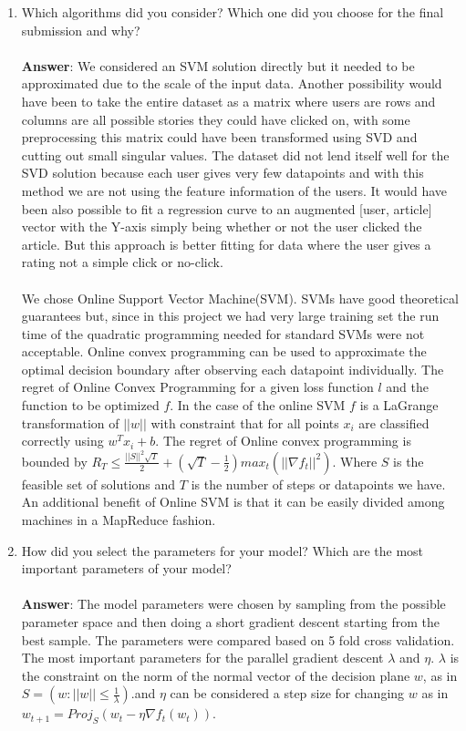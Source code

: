 \documentclass[11pt]{article}
\begin{document}
\begin{enumerate}
\item Which algorithms did you consider? Which one did you choose for the
  final submission and why? \\ \\
\textbf{Answer}:  
We considered an SVM solution directly but it needed to be approximated due to
the scale of the input data. Another possibility would have been to take the
entire dataset as a matrix where users are rows and columns are all possible
stories they could have clicked on, with some preprocessing this matrix could
have been transformed using SVD and cutting out small singular values. The
dataset did not lend itself well for the SVD solution because each user gives
very few datapoints and with this method we are not using the feature
information of the users. It would have been also possible to fit a regression
curve to an augmented [user, article] vector with the Y-axis simply being
whether or not the user clicked the article. But this approach is better fitting
for data where the user gives a rating not a simple click or no-click.
\\ \\
We chose Online Support Vector Machine(SVM). SVMs have good theoretical
guarantees but, since in this project we had very large training set the run
time of the quadratic programming needed for standard SVMs were not acceptable.
Online convex programming can be used to approximate the optimal decision
boundary after observing each datapoint individually. The regret of Online
Convex Programming for a given loss function $l$ and the function to be
optimized $f$. In the case of the online SVM $f$ is a LaGrange transformation
of $||w||$ with constraint that for all points $x_i$ are classified correctly
using $w^T x_i + b$. The regret of Online convex programming is bounded by $R_T
\leq \frac{||S||^2 \sqrt{T}}{2} + (\sqrt{T} - \frac{1}{2}) max_t(||\nabla
f_t||^2)$. Where $S$ is the feasible set of solutions and $T$ is the number of
steps or datapoints we have. An additional benefit of Online SVM is that it can
be easily divided among machines in a MapReduce fashion.

\item How did you select the parameters for your model? Which are the
  most important parameters of your model? \\ \\
\textbf{Answer}: The model parameters were chosen by sampling from the
possible parameter space and then doing a short gradient descent starting from
the best sample. The parameters were compared based on 5 fold cross validation.
The most important parameters for the parallel gradient descent $\lambda$ and
$\eta$. $\lambda$ is the constraint on the norm of the normal vector of the
decision plane $w$, as in $S=(w:||w||\leq \frac{1}{\lambda})$.and $\eta$ can be
considered a step size for changing $w$ as in $w_{t+1} = Proj_S(w_t - \eta
\nabla f_t(w_t))$.

\end{enumerate}
\end{document}
